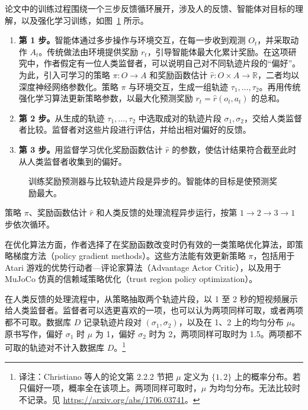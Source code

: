 论文中的训练过程围绕一个三步反馈循环展开，涉及人的反馈、智能体对目标的理解，以及强化学习训练，如图~\ref{fig:ch05-reward-predictor} 所示。

\begin{enumerate}
\item \textbf{第 1 步。}智能体通过多步操作与环境交互，在每一步收到观测 $O_t$，并采取动作 $A_t$。传统做法由环境提供奖励 $r_t$，引导智能体最大化累计奖励。在这项研究中，作者假定有一位人类监督者，可以说明自己对不同轨迹片段的“偏好”。为此，引入可学习的策略 $\pi\colon O\to A$ 和奖励函数估计 $\hat r\colon O\times A\to\mathbb{R}$，二者均以深度神经网络参数化。策略 $\pi$ 与环境交互，生成一组轨迹 $\tau_1,\ldots,\tau_2$。再用传统强化学习算法更新策略参数，以最大化预测奖励 $r_t=\hat r(o_t,a_t)$ 的总和。
\item \textbf{第 2 步。}从生成的轨迹 $\tau_1,\ldots,\tau_2$ 中选取成对的轨迹片段 $\sigma_1,\sigma_2$，交给人类监督者比较。监督者对这些片段进行评估，并给出相对偏好的反馈。
\item \textbf{第 3 步。}用监督学习优化奖励函数估计 $\hat r$ 的参数，使估计结果符合截至此时从人类监督者收集到的偏好。
\end{enumerate}

\begin{figure}[!htbp]
\centering

\caption{训练奖励预测器与比较轨迹片段是异步的。智能体的目标是使预测奖励最大。}
\label{fig:ch05-reward-predictor}
\end{figure}

策略 $\pi$、奖励函数估计 $\hat r$ 和人类反馈的处理流程异步运行，按第 $1\to 2\to 3\to 1$ 步依次循环。

在优化算法方面，作者选择了在奖励函数改变时仍有效的一类策略优化算法，即策略梯度方法（policy gradient methods）。这些方法能有效更新策略 $\pi$，包括用于 Atari 游戏的优势行动者—评论家算法（Advantage Actor Critic），以及用于 MuJoCo 仿真的信赖域策略优化（trust region policy optimization）。

在人类反馈的处理流程中，从策略抽取两个轨迹片段，以 1 至 2 秒的短视频展示给人类监督者。监督者可以选更喜欢的一项，也可以认为两项同样可取，或者两项都不可取。数据库 $D$ 记录轨迹片段对 $(\sigma_1,\sigma_2)$，以及在 1、2 上的均匀分布 $\mu$。原书写作，偏好 $\sigma_1$ 时 $\mu$ 为 1，偏好 $\sigma_2$ 时为 2，两项同样可取时为 1.5。两项都不可取的轨迹对不计入数据库 $D$。\footnote{译注：Christiano 等人的论文第 2.2.2 节把 $\mu$ 定义为 $\{1,2\}$ 上的概率分布。若只偏好一项，概率全在该项上。两项同样可取时，$\mu$ 为均匀分布。无法比较时不记录。见 \url{https://arxiv.org/abs/1706.03741}。}

